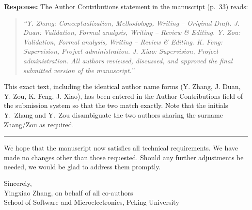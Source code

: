 \documentclass[11pt,a4paper]{article}
\begin{document}
\vspace{0.5em}
\noindent\textbf{Response:}
The Author Contributions statement in the manuscript (p.~33) reads:

\vspace{0.5em}
\noindent\begin{quote}
\itshape ``Y. Zhang: Conceptualization, Methodology, Writing -- Original Draft. J. Duan: Validation, Formal analysis, Writing -- Review \& Editing. Y. Zou: Validation, Formal analysis, Writing -- Review \& Editing. K. Feng: Supervision, Project administration. J. Xiao: Supervision, Project administration. All authors reviewed, discussed, and approved the final submitted version of the manuscript.''
\end{quote}

\vspace{0.5em}
\noindent This exact text, including the identical author name forms (Y. Zhang, J. Duan, Y. Zou, K. Feng, J. Xiao), has been entered in the Author Contributions field of the submission system so that the two match exactly. Note that the initials Y.~Zhang and Y.~Zou disambiguate the two authors sharing the surname Zhang/Zou as required.

\vspace{1.5em}
\hrule
\vspace{1.5em}

\noindent We hope that the manuscript now satisfies all technical requirements. We have made no changes other than those requested. Should any further adjustments be needed, we would be glad to address them promptly.

\vspace{1.5em}
\noindent Sincerely,\\[0.5em]
Yingxiao Zhang, on behalf of all co-authors\\
\small School of Software and Microelectronics, Peking University
\end{document}
